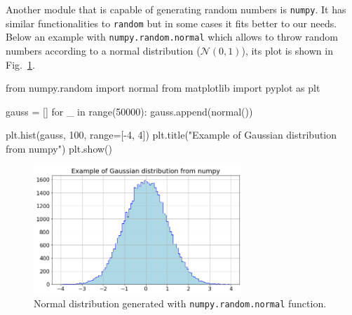 Another module that is capable of generating random numbers is \texttt{numpy}. It has similar functionalities to \texttt{random} but in some cases it fits better to our needs.    
Below an example with \texttt{numpy.random.normal} which allows to throw random numbers according to a normal distribution
(\(\mathcal{N}(0, 1)\)), its plot is shown in Fig.~\ref{fig:gauss_dist}.

\begin{ipython}
from numpy.random import normal
from matplotlib import pyplot as plt

gauss = []
for _ in range(50000):
    gauss.append(normal())

plt.hist(gauss, 100, range=[-4, 4])
plt.title("Example of Gaussian distribution from numpy")
plt.show()
\end{ipython}

\begin{figure}
   \centering
   \includegraphics[width=0.7\textwidth]{figures/standard_normal}
   \caption{Normal distribution generated with \texttt{numpy.random.normal} function.}
\label{fig:gauss_dist}
\end{figure}

